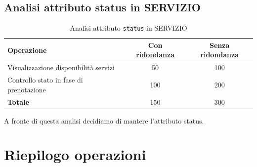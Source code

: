\documentclass[a4paper,12pt]{report}
\begin{document}
\subsection{Analisi attributo status in SERVIZIO}

\begin{table}[H]
	\centering
	\begin{tabular}{|l|c|c|}
		\hline
		\textbf{Operazione}                     & \textbf{Con ridondanza} & \textbf{Senza ridondanza} \\
		\hline
		Visualizzazione disponibilità servizi   & 50                      & 100                       \\
		Controllo stato in fase di prenotazione & 100                     & 200                       \\
		\hline
		\textbf{Totale}                         & 150                     & 300                       \\
		\hline
	\end{tabular}
	\caption{Analisi attributo \texttt{status} in SERVIZIO}
\end{table}

A fronte di questa analisi decidiamo di mantere l'attributo status.

\section{Riepilogo operazioni}
\end{document}
